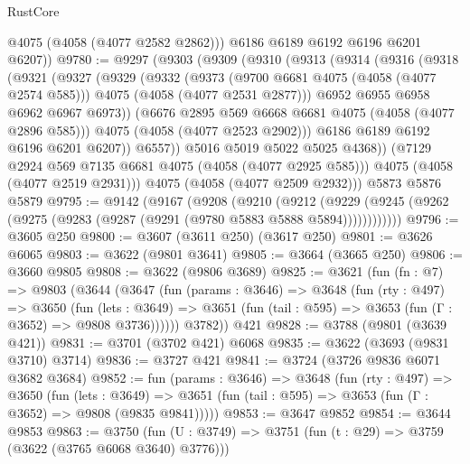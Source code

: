 \begin{lexlean}{RustCore}
\begin{coremodule}
          @4075
          (@4058 (@4077 @2582 @2862)))
        @6186
        @6189
        @6192
        @6196
        @6201
        @6207))
@9780 := @9297
    (@9303
      (@9309
        (@9310
          (@9313
            (@9314
              (@9316
                (@9318
                  (@9321
                    (@9327
                      (@9329
                        (@9332
                          (@9373
                            (@9700 @6681 @4075 (@4058 (@4077 @2574 @585)))
                            @4075
                            (@4058 (@4077 @2531 @2877)))
                          @6952
                          @6955
                          @6958
                          @6962
                          @6967
                          @6973))
                      (@6676 @2895 @569 @6668 @6681 @4075 (@4058 (@4077 @2896 @585)))
                      @4075
                      (@4058 (@4077 @2523 @2902)))
                    @6186
                    @6189
                    @6192
                    @6196
                    @6201
                    @6207))
                @6557))
            @5016
            @5019
            @5022
            @5025
            @4368))
        (@7129 @2924 @569 @7135 @6681 @4075 (@4058 (@4077 @2925 @585)))
        @4075
        (@4058 (@4077 @2519 @2931)))
      @4075
      (@4058 (@4077 @2509 @2932)))
    @5873
    @5876
    @5879
@9795 := @9142
    (@9167
      (@9208
        (@9210
          (@9212
            (@9229 (@9245 (@9262 (@9275 (@9283 (@9287 (@9291 (@9780 @5883 @5888 @5894))))))))))))
@9796 := @3605 @250
@9800 := @3607 (@3611 @250) (@3617 @250)
@9801 := @3626 @6065
@9803 := @3622 (@9801 @3641)
@9805 := @3664 (@3665 @250)
@9806 := @3660 @9805
@9808 := @3622 (@9806 @3689)
@9825 := @3621
    (fun (fn : @7) =>
    @9803
      (@3644
        (@3647
          (fun (params : @3646) =>
          @3648
            (fun (rty : @497) =>
            @3650
              (fun (lets : @3649) =>
              @3651 (fun (tail : @595) => @3653 (fun (Γ : @3652) => @9808 @3736))))))
        @3782))
    @421
@9828 := @3788 (@9801 (@3639 @421))
@9831 := @3701 (@3702 @421) @6068
@9835 := @3622 (@3693 (@9831 @3710) @3714)
@9836 := @3727 @421
@9841 := @3724 (@3726 @9836 @6071 @3682 @3684)
@9852 := fun (params : @3646) =>
  @3648
    (fun (rty : @497) =>
    @3650
      (fun (lets : @3649) =>
      @3651 (fun (tail : @595) => @3653 (fun (Γ : @3652) => @9808 (@9835 @9841)))))
@9853 := @3647 @9852
@9854 := @3644 @9853
@9863 := @3750 (fun (U : @3749) => @3751 (fun (t : @29) => @3759 (@3622 (@3765 @6068 @3640) @3776)))

\end{coremodule}
\end{lexlean}
